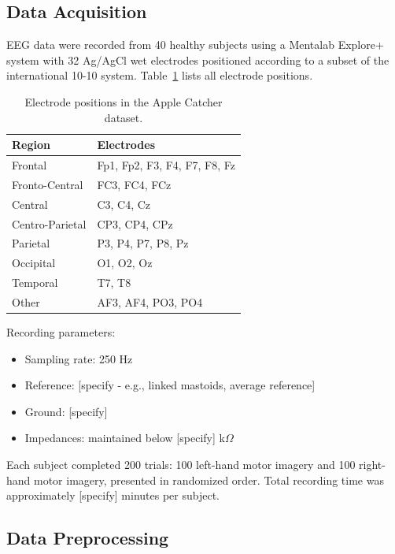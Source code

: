 \subsection{Data Acquisition}
\label{subsec:methods_acquisition}

EEG data were recorded from 40 healthy subjects using a Mentalab Explore+ system with 32 Ag/AgCl wet electrodes positioned according to a subset of the international 10-10 system. Table~\ref{tab:electrodes} lists all electrode positions.

\begin{table}[htbp]
\centering
\caption{Electrode positions in the Apple Catcher dataset.}
\label{tab:electrodes}
\begin{tabular}{@{}ll@{}}
\toprule
\textbf{Region} & \textbf{Electrodes} \\
\midrule
Frontal & Fp1, Fp2, F3, F4, F7, F8, Fz \\
Fronto-Central & FC3, FC4, FCz \\
Central & C3, C4, Cz \\
Centro-Parietal & CP3, CP4, CPz \\
Parietal & P3, P4, P7, P8, Pz \\
Occipital & O1, O2, Oz \\
Temporal & T7, T8 \\
Other & AF3, AF4, PO3, PO4 \\
\bottomrule
\end{tabular}
\end{table}


Recording parameters:
\begin{itemize}
    \item Sampling rate: 250 Hz
    \item Reference: [specify - e.g., linked mastoids, average reference]
    \item Ground: [specify]
    \item Impedances: maintained below [specify] k$\Omega$
\end{itemize}

Each subject completed 200 trials: 100 left-hand motor imagery and 100 right-hand motor imagery, presented in randomized order. Total recording time was approximately [specify] minutes per subject.


\subsection{Data Preprocessing}
\label{subsec:methods_preprocessing}

